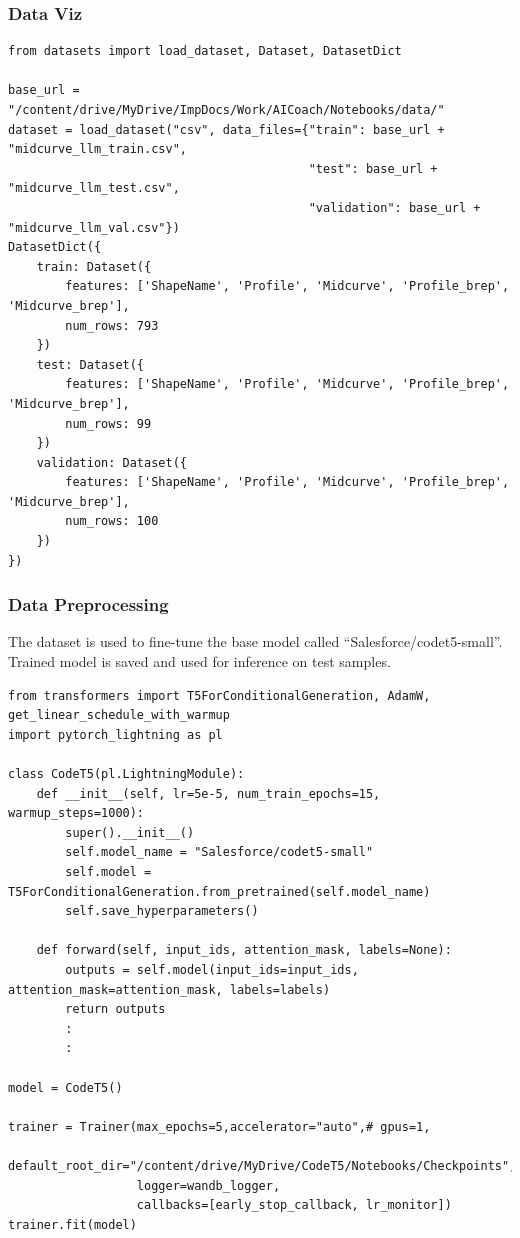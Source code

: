 \begin{frame}[fragile]\frametitle{Data Viz}

\begin{lstlisting}[basicstyle=\tiny, breaklines=true, breakatwhitespace=true,label=lst:python]
from datasets import load_dataset, Dataset, DatasetDict

base_url = "/content/drive/MyDrive/ImpDocs/Work/AICoach/Notebooks/data/"
dataset = load_dataset("csv", data_files={"train": base_url + "midcurve_llm_train.csv",
                                          "test": base_url + "midcurve_llm_test.csv",
                                          "validation": base_url + "midcurve_llm_val.csv"})
DatasetDict({
    train: Dataset({
        features: ['ShapeName', 'Profile', 'Midcurve', 'Profile_brep', 'Midcurve_brep'],
        num_rows: 793
    })
    test: Dataset({
        features: ['ShapeName', 'Profile', 'Midcurve', 'Profile_brep', 'Midcurve_brep'],
        num_rows: 99
    })
    validation: Dataset({
        features: ['ShapeName', 'Profile', 'Midcurve', 'Profile_brep', 'Midcurve_brep'],
        num_rows: 100
    })
})

\end{lstlisting}

\end{frame}

\begin{frame}[fragile]\frametitle{Data Preprocessing}

The dataset is used to fine-tune the base model called ``Salesforce/codet5-small''. Trained model is saved and used for inference on test samples.

\begin{lstlisting}[basicstyle=\tiny, breaklines=true, breakatwhitespace=true,label=lst:python]
from transformers import T5ForConditionalGeneration, AdamW, get_linear_schedule_with_warmup
import pytorch_lightning as pl

class CodeT5(pl.LightningModule):
    def __init__(self, lr=5e-5, num_train_epochs=15, warmup_steps=1000):
        super().__init__()
        self.model_name = "Salesforce/codet5-small"
        self.model = T5ForConditionalGeneration.from_pretrained(self.model_name)
        self.save_hyperparameters()
        
    def forward(self, input_ids, attention_mask, labels=None):
        outputs = self.model(input_ids=input_ids, attention_mask=attention_mask, labels=labels)
        return outputs        
        :
        :

model = CodeT5()

trainer = Trainer(max_epochs=5,accelerator="auto",# gpus=1,
                  default_root_dir="/content/drive/MyDrive/CodeT5/Notebooks/Checkpoints",
                  logger=wandb_logger,
                  callbacks=[early_stop_callback, lr_monitor])
trainer.fit(model)
\end{lstlisting}

\end{frame}

